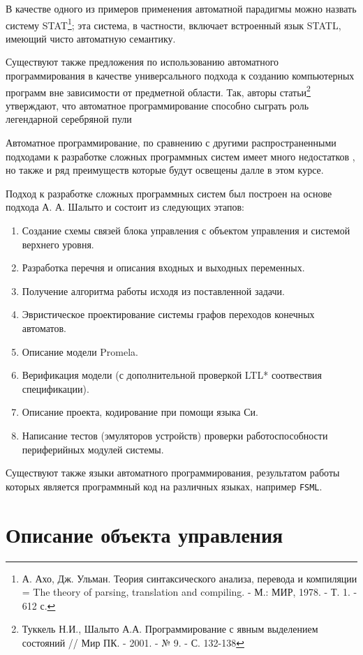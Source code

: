 \documentclass[12pt, twoside]{report}
\begin{document}
В качестве одного из примеров применения автоматной парадигмы можно назвать систему STAT\footnote{А. Ахо, Дж. Ульман. Теория синтаксического анализа, перевода и компиляции = The theory of parsing, translation and compiling. - М.: МИР, 1978. - Т. 1. - 612 с.}; эта система, в частности, включает встроенный язык STATL, имеющий чисто автоматную семантику.

Существуют также предложения по использованию автоматного программирования в качестве универсального подхода к созданию компьютерных программ вне зависимости от предметной области. Так, авторы статьи\footnote{Туккель Н.И., Шалыто А.А. Программирование с явным выделением состояний // Мир ПК. - 2001. - № 9. - С. 132-138} утверждают, что автоматное программирование способно сыграть роль легендарной серебряной пули


Автоматное программирование, по сравнению с другими распространенными подходами к 
разработке сложных программных систем имеет много недостатков , 
но также и ряд преимуществ которые будут освещены далле в этом курсе.

Подход к разработке сложных программных систем был построен на основе подхода А. А. Шалыто\cite{Shalito:AutomataProgramming} и 
состоит из следующих этапов:
\begin{enumerate}
  \item Создание схемы связей блока управления с объектом управления и системой верхнего уровня.
  \item Разработка перечня и описания входных и выходных переменных.
  \item Получение алгоритма работы исходя из поставленной задачи.
  \item Эвристическое проектирование системы графов переходов конечных автоматов.
  \item Описание модели Promela.
  \item Верификация модели (с дополнительной проверкой LTL* соотвествия спецификации).
  \item Описание проекта, кодирование при помощи языка Си.
  \item Написание тестов (эмуляторов устройств) проверки работоспособности периферийных модулей системы.
\end{enumerate}

Существуют также языки автоматного программирования, результатом работы которых является программный 
код на различных языках, например \texttt{FSML}\cite{Lagunov:FSML}.

\chapter*{Описание объекта управления}
\end{document}
